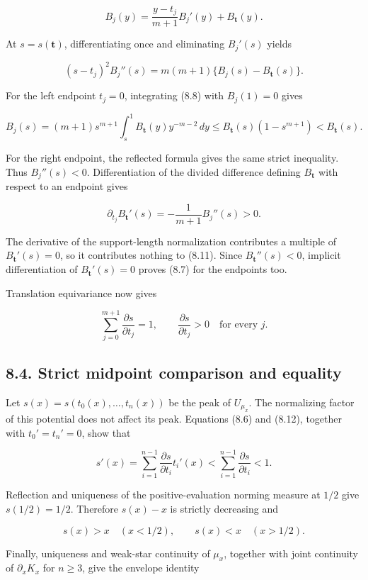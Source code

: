 \documentclass[11pt]{article}
\begin{document}
\[
B_j(y)=\frac{y-t_j}{m+1}B_j'(y)+B_{\mathbf t}(y).
\tag{8.8}
\]

At \(s=s(\mathbf t)\), differentiating once and eliminating \(B_j'(s)\)
yields

\[
(s-t_j)^2B_j''(s)
=m(m+1)\{B_j(s)-B_{\mathbf t}(s)\}.
\tag{8.9}
\]

For the left endpoint \(t_j=0\), integrating (8.8) with \(B_j(1)=0\)
gives

\[
B_j(s)=(m+1)s^{m+1}\int_s^1B_{\mathbf t}(y)y^{-m-2}\,dy
\le B_{\mathbf t}(s)(1-s^{m+1})<B_{\mathbf t}(s).
\tag{8.10}
\]

For the right endpoint, the reflected formula gives the same strict
inequality. Thus \(B_j''(s)<0\). Differentiation of the divided
difference defining \(B_{\mathbf t}\) with respect to an endpoint gives

\[
\partial_{t_j}B_{\mathbf t}'(s)=-\frac1{m+1}B_j''(s)>0.
\tag{8.11}
\]

The derivative of the support-length normalization contributes a
multiple of \(B_{\mathbf t}'(s)=0\), so it contributes nothing to
(8.11). Since \(B_{\mathbf t}''(s)<0\), implicit differentiation of
\(B_{\mathbf t}'(s)=0\) proves (8.7) for the endpoints too.

Translation equivariance now gives

\[
\sum_{j=0}^{m+1}\frac{\partial s}{\partial t_j}=1,
\qquad \frac{\partial s}{\partial t_j}>0\quad\text{for every }j.
\tag{8.12}
\]

\subsection{8.4. Strict midpoint comparison and
equality}\label{strict-midpoint-comparison-and-equality}

Let \(s(x)=s(t_0(x),\ldots,t_n(x))\) be the peak of \(U_{\mu_x}\). The
normalizing factor of this potential does not affect its peak. Equations
(8.6) and (8.12), together with \(t_0'=t_n'=0\), show that

\[
s'(x)=\sum_{i=1}^{n-1}\frac{\partial s}{\partial t_i}t_i'(x)
<\sum_{i=1}^{n-1}\frac{\partial s}{\partial t_i}<1.
\tag{8.13}
\]

Reflection and uniqueness of the positive-evaluation norming measure at
\(1/2\) give \(s(1/2)=1/2\). Therefore \(s(x)-x\) is strictly decreasing
and

\[
s(x)>x\quad(x<1/2),\qquad s(x)<x\quad(x>1/2).
\tag{8.14}
\]

Finally, uniqueness and weak-star continuity of \(\mu_x\), together with
joint continuity of \(\partial_xK_x\) for \(n\ge3\), give the envelope
identity
\end{document}
